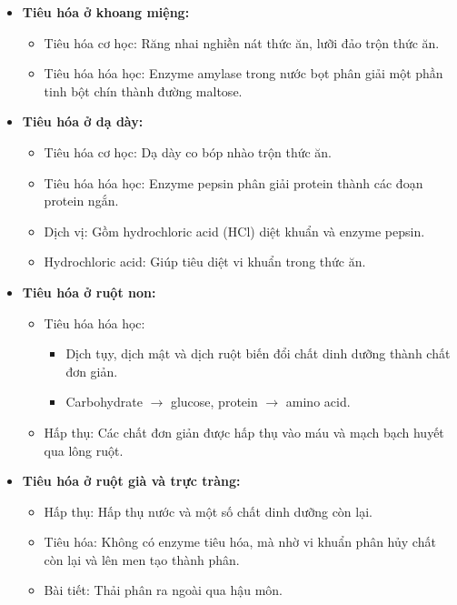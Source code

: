 \documentclass[Main.tex]{subfiles}
\begin{document}
    \begin{itemize}
        \item \textbf{Tiêu hóa ở khoang miệng:}
            \begin{itemize}
                \item Tiêu hóa cơ học: Răng nhai nghiền nát thức ăn, lưỡi đảo trộn thức ăn.
                \item Tiêu hóa hóa học: Enzyme amylase trong nước bọt phân giải một phần tinh bột chín thành đường maltose.
            \end{itemize}
        \item \textbf{Tiêu hóa ở dạ dày:}
            \begin{itemize}
                \item Tiêu hóa cơ học: Dạ dày co bóp nhào trộn thức ăn.
                \item Tiêu hóa hóa học: Enzyme pepsin phân giải protein thành các đoạn protein ngắn.
                \item Dịch vị: Gồm hydrochloric acid (HCl) diệt khuẩn và enzyme pepsin.
                \item Hydrochloric acid: Giúp tiêu diệt vi khuẩn trong thức ăn.
            \end{itemize}
        \item \textbf{Tiêu hóa ở ruột non:}
            \begin{itemize}
                \item Tiêu hóa hóa học:
                    \begin{itemize}
                        \item Dịch tụy, dịch mật và dịch ruột biến đổi chất dinh dưỡng thành chất đơn giản.
                        \item Carbohydrate $\rightarrow$ glucose, protein $\rightarrow$ amino acid.
                    \end{itemize}
                \item Hấp thụ: Các chất đơn giản được hấp thụ vào máu và mạch bạch huyết qua lông ruột.
            \end{itemize}
        \item \textbf{Tiêu hóa ở ruột già và trực tràng:}
            \begin{itemize}
                \item Hấp thụ: Hấp thụ nước và một số chất dinh dưỡng còn lại.
                \item Tiêu hóa: Không có enzyme tiêu hóa, mà nhờ vi khuẩn phân hủy chất còn lại và lên men tạo thành phân.
                \item Bài tiết: Thải phân ra ngoài qua hậu môn.
            \end{itemize}
    \end{itemize}
\end{document}
